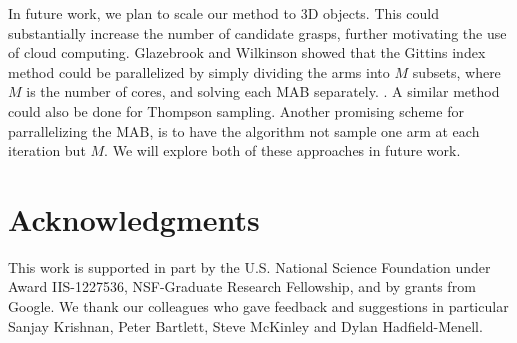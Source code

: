 \documentclass[10pt, conference]{ieeeconf}      %
\begin{document}
In future work, we plan to scale our method to 3D objects. This could substantially increase the number of candidate grasps, further motivating the use of cloud computing. Glazebrook and Wilkinson showed that the Gittins index method could be parallelized by simply dividing the arms into $M$ subsets, where $M$ is the number of cores, and solving each MAB separately. \cite{glazebrook2000index}. A similar method could also be done for Thompson sampling. Another promising scheme for parrallelizing the MAB, is to have the algorithm not sample one arm at each iteration but $M$. We will explore both of these approaches in future work.

\section{Acknowledgments} 
This work is supported in part by the U.S. National Science Foundation under Award IIS-1227536, NSF-Graduate Research Fellowship, and by grants from Google. 
We thank our colleagues who gave feedback and suggestions in particular Sanjay Krishnan, Peter Bartlett, Steve McKinley and Dylan Hadfield-Menell.



\end{document}
